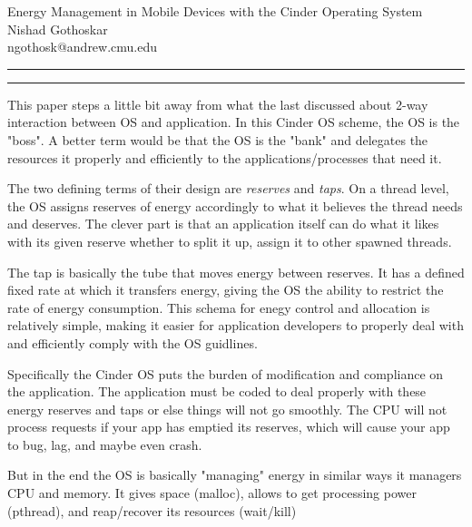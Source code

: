 \documentclass[11pt]{article}
\newcommand{\question}[2] {\vspace{.25in} \hrule\vspace{0.5em}
	\noindent{\bf #1: #2} \vspace{0.5em}
	\hrule \vspace{.10in}}
\newcommand{\myname}{Nishad Gothoskar}
\newcommand{\myandrew}{ngothosk}
\begin{document}
	
	\medskip                        %
	
	\thispagestyle{plain}
	\begin{center}                  %
		{\Large Energy Management in Mobile Devices with the Cinder Operating System} \\
		\myname \\
		\myandrew @andrew.cmu.edu\\
	\end{center}
	
	\question{1}{Summary}
	\quad This paper steps a little bit away from what the last discussed about 2-way interaction between OS and application. In this Cinder OS scheme, the OS is the "boss". A better term would be that the OS is the "bank" and delegates the resources it properly and efficiently to the applications/processes that need it.
	
	\quad The two defining terms of their design are \textit{reserves} and \textit{taps}. On a thread level, the OS assigns reserves of energy accordingly to what it believes the thread needs and deserves. The clever part is that an application itself can do what it likes with its given reserve whether to split it up, assign it to other spawned threads.
	
	\quad The tap is basically the tube that moves energy between reserves. It has a defined fixed rate at which it transfers energy, giving the OS the ability to restrict the rate of energy consumption. This schema for enegy control and allocation is relatively simple, making it easier for application developers to properly deal with and efficiently comply with the OS guidlines.
	
	\quad Specifically the Cinder OS puts the burden of modification and compliance on the application. The application must be coded to deal properly with these energy reserves and taps or else things will not go smoothly. The CPU will not process requests if your app has emptied its reserves, which will cause your app to bug, lag, and maybe even crash.
	
	\quad But in the end the OS is basically "managing" energy in similar ways it managers CPU and memory. It gives space (malloc), allows to get processing power (pthread), and reap/recover its resources (wait/kill)
	
\end{document}
